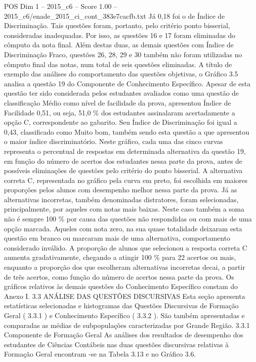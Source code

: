 \begin{textsample}{POS Dim 1 – 2015\_c6 – Score 1.00 – 2015\_c6/enade\_2015\_ci\_cont\_383e7cacfb.txt}
Já 0,18 foi o de Índice de Discriminação.
Tais questões foram, portanto, pelo critério ponto bisserial, consideradas inadequadas.
Por isso, as questões 16 e 17 foram eliminadas do cômputo da nota final.
Além destas duas, as demais questões com Índice de Discriminação Fraco, questões 26, 28, 29 e 30 também não foram utilizadas no cômputo final das notas, num total de seis questões eliminadas.
A título de exemplo das análises do comportamento das questões objetivas, o Gráfico 3.5 analisa a questão 19 do Componente de Conhecimento Específico.
Apesar de esta questão ter sido considerada pelos estudantes avaliados como uma questão de classificação Médio como nível de facilidade da prova, apresentou Índice de Facilidade 0,51, ou seja, 51,0 \% dos estudantes assinalaram acertadamente a opção C, correspondente ao gabarito.
Seu Índice de Discriminação foi igual a 0,43, classificado como Muito bom, também sendo esta questão a que apresentou o maior índice discriminatório.
Neste gráfico, cada uma das cinco curvas representa o percentual de respostas em determinada alternativa da questão 19, em função do número de acertos dos estudantes nessa parte da prova, antes de possíveis eliminações de questões pelo critério do ponto bisserial.
A alternativa correta C, representada no gráfico pela curva em preto, foi escolhida em maiores proporções pelos alunos com desempenho melhor nessa parte da prova.
Já as alternativas incorretas, também denominadas distratores, foram selecionadas, principalmente, por aqueles com notas mais baixas.
Neste caso também a soma não é sempre 100 \% por causa das questões não respondidas ou com mais de uma opção marcada.
Aqueles com nota zero, na sua quase totalidade deixaram esta questão em branco ou marcaram mais de uma alternativa, comportamento considerado inválido.
A proporção de alunos que selecionou a resposta correta C aumenta gradativamente, chegando a atingir 100 \% para 22 acertos ou mais, enquanto a proporção dos que escolheram alternativas incorretas decai, a partir de três acertos, como função do número de acertos nessa parte da prova.
Os gráficos relativos às demais questões do Conhecimento Específico constam do Anexo I. 3.3 ANÁLISE DAS QUESTÕES DISCURSIVAS Esta seção apresenta estatísticas selecionadas e histogramas das Questões Discursivas de Formação Geral ( 3.3.1 ) e Conhecimento Específico ( 3.3.2 ).
São também apresentadas e comparadas as médias de subpopulações caracterizadas por Grande Região. 3.3.1 Componente de Formação Geral As análises dos resultados de desempenho dos estudantes de Ciências Contábeis nas duas questões discursivas relativas à Formação Geral encontram -se na Tabela 3.13 e no Gráfico 3.6.

\end{textsample}
